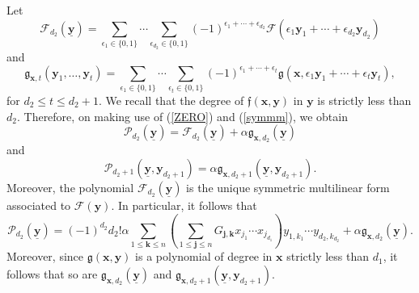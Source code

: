 \documentclass[12pt, reqno]{amsart}
\numberwithin{equation}{section}
\newcommand{\0}{\mathbf{0}}
\renewcommand{\leq}{\leqslant}
\newcommand{\x}{\mathbf{x}}
\newcommand{\y}{\mathbf{y}}
\renewcommand{\=}{\equiv}
\newcommand{\1}{\mathbf{1}}
\theoremstyle{definition}
\begin{document}
Let
$$
\mathcal{F}_{d_2}(\underline{\mathbf{y}}) = \sum_{\epsilon_1 \in \{0, 1\} } \cdots \sum_{\epsilon_{d_2} \in \{0, 1\} }
(-1)^{\epsilon_1 + \cdots + \epsilon_{d_2} }
\mathcal{F}( \epsilon_1 \mathbf{y}_1 + \cdots + \epsilon_{d_2} \mathbf{y}_{d_2} )
$$
and
$$
\mathfrak{g}_{\x, t} (\mathbf{y}_1, \ldots, \mathbf{y}_{t}) = \sum_{\epsilon_1 \in \{0, 1\} } \cdots \sum_{\epsilon_{t} \in \{0, 1\} }
(-1)^{\epsilon_1 + \cdots + \epsilon_{t} }
\mathfrak{g} (\x,  \epsilon_1 \mathbf{y}_1 + \cdots + \epsilon_{t} \mathbf{y}_{t} ),
$$
for $d_2 \leq t \leq d_2 + 1$. We recall that the degree of $\mathfrak{f}(\x, \y)$ in $\y$ is strictly less than $d_2$.
Therefore, on making use of (\ref{ZERO}) and (\ref{symmm}), we obtain
$$
\mathcal{P}_{d_2}(\underline{\mathbf{y}}) = \mathcal{F}_{d_2}(\underline{\mathbf{y}}) +
\alpha \mathfrak{g}_{\x, d_2} (\underline{\mathbf{y}})
$$
and 
$$
\mathcal{P}_{d_2 + 1}(\underline{\mathbf{y}}, \mathbf{y}_{d_2 + 1}) = \alpha \mathfrak{g}_{\x, d_2 + 1} (\underline{\mathbf{y}}, \mathbf{y}_{d_2 + 1}).
$$
Moreover,  the polynomial $\mathcal{F}_{d_2} (\underline{\mathbf{y}})$ is the unique symmetric multilinear form associated to $\mathcal{F} (\y)$.
In particular, it follows that
\begin{equation}\label{XXXXX}
\mathcal{P}_{d_2}( \underline{\mathbf{y}} )
=
(-1)^{d_2} d_2!  \alpha \sum_{ 1 \leq  \mathbf{k} \leq n } \left(  \sum_{ 1 \leq   \mathbf{j}  \leq n } G_{ \mathbf{j}, \mathbf{k} }  x_{j_1} \cdots x_{j_{d_1}} \right)  y_{1, k_1} \cdots y_{d_2, k_{d_2}}
+
\alpha \mathfrak{g}_{\x, d_2}(\underline{\mathbf{y}}).
\end{equation}
Moreover, since $\mathfrak{g} (\x, \mathbf{y})$ is a polynomial of degree  in $\mathbf{x}$ strictly less than $d_1$, it follows that so are 
$\mathfrak{g}_{\x, d_2}(\underline{\mathbf{y}})$ and $\mathfrak{g}_{\x, d_2 + 1}(\underline{\mathbf{y}}, \mathbf{y}_{d_2 + 1})$.
\end{document}
